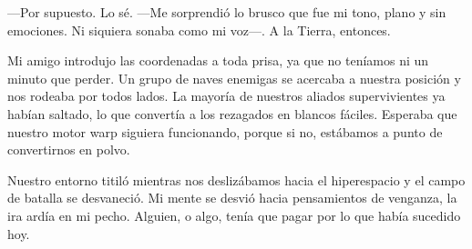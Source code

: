 —Por supuesto. Lo sé. —Me sorprendió lo brusco que fue mi tono, plano y sin emociones. Ni siquiera sonaba como mi voz—. A la Tierra, entonces.

Mi amigo introdujo las coordenadas a toda prisa, ya que no teníamos ni un minuto que perder. Un grupo de naves enemigas se acercaba a nuestra posición y nos rodeaba por todos lados. La mayoría de nuestros aliados supervivientes ya habían saltado, lo que convertía a los rezagados en blancos fáciles. Esperaba que nuestro motor warp siguiera funcionando, porque si no, estábamos a punto de convertirnos en polvo.

Nuestro entorno titiló mientras nos deslizábamos hacia el hiperespacio y el campo de batalla se desvaneció. Mi mente se desvió hacia pensamientos de venganza, la ira ardía en mi pecho. Alguien, o algo, tenía que pagar por lo que había sucedido hoy.
